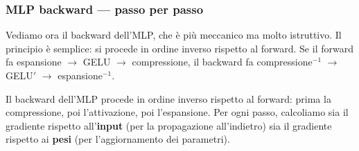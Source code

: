 \documentclass[12pt,a4paper]{article}
\begin{document}
\subsubsection{MLP backward --- passo per passo} \label{sec:mlp_backward}

Vediamo ora il backward dell'MLP, che \`e pi\`u meccanico ma molto istruttivo. Il principio \`e semplice: si procede in ordine inverso rispetto al forward. Se il forward fa espansione $\to$ GELU $\to$ compressione, il backward fa compressione$^{-1}$ $\to$ GELU$'$ $\to$ espansione$^{-1}$.

Il backward dell'MLP procede in ordine inverso rispetto al forward: prima la compressione, poi l'attivazione, poi l'espansione. Per ogni passo, calcoliamo sia il gradiente rispetto all'\textbf{input} (per la propagazione all'indietro) sia il gradiente rispetto ai \textbf{pesi} (per l'aggiornamento dei parametri).
\end{document}
